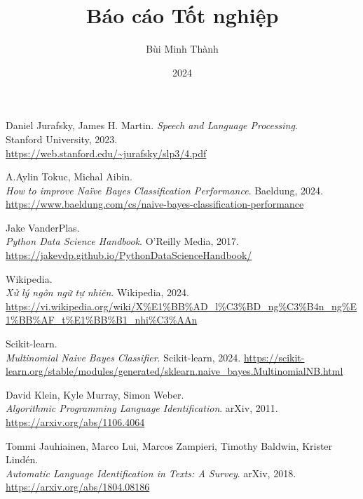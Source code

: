 \documentclass[a4paper,12pt]{report}
\title{Báo cáo Tốt nghiệp}
\author{Bùi Minh Thành}
\date{2024}
\begin{document}



\tableofcontents %





\begin{thebibliography}{99}

Daniel Jurafsky, James H. Martin.
\textit{Speech and Language Processing}. \\
Stanford University, 2023. \\
\url{https://web.stanford.edu/~jurafsky/slp3/4.pdf}

A.Aylin Tokuc, Michal Aibin. \\
\textit{How to improve Naïve Bayes Classification Performance}. 
Baeldung, 2024. \\
\url{https://www.baeldung.com/cs/naive-bayes-classification-performance}

Jake VanderPlas. \\
\textit{Python Data Science Handbook}. 
O'Reilly Media, 2017. \\
\url{https://jakevdp.github.io/PythonDataScienceHandbook/}

Wikipedia. \\
\textit{Xử lý ngôn ngữ tự nhiên}. 
Wikipedia, 2024. 
\url{https://vi.wikipedia.org/wiki/X%E1%BB%AD_l%C3%BD_ng%C3%B4n_ng%E1%BB%AF_t%E1%BB%B1_nhi%C3%AAn}

Scikit-learn. \\
\textit{Multinomial Naive Bayes Classifier}. 
Scikit-learn, 2024. 
\url{https://scikit-learn.org/stable/modules/generated/sklearn.naive_bayes.MultinomialNB.html}

David Klein, Kyle Murray, Simon Weber. \\
\textit{Algorithmic Programming Language Identification}. 
arXiv, 2011. \\
\url{https://arxiv.org/abs/1106.4064}

Tommi Jauhiainen, Marco Lui, Marcos Zampieri, Timothy Baldwin, Krister Lindén. \\
\textit{Automatic Language Identification in Texts: A Survey}. 
arXiv, 2018. \\
\url{https://arxiv.org/abs/1804.08186}


\end{thebibliography}
\end{document}
